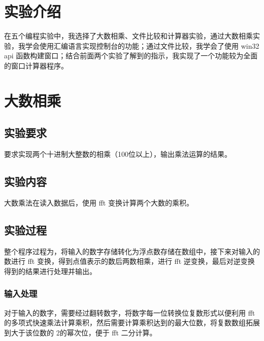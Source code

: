 \documentclass[proposal-report]{bitart}
\begin{document}
% 

\pagestyle{fancy}
\setcounter{page}{1}


\setlength{\parskip}{0em}
\renewcommand{\baselinestretch}{1.53}
\setlength{\parindent}{1.02cm}

\tableofcontents
\newpage



\section{实验介绍}

在五个编程实验中，我选择了大数相乘、文件比较和计算器实验，通过大数相乘实验，我学会使用汇编语言实现控制台的功能；通过文件比较，我学会了使用 win32 api 函数构建窗口；结合前面两个实验了解到的指示，我实现了一个功能较为全面的窗口计算器程序。

\section{大数相乘}

\subsection{实验要求}

要求实现两个十进制大整数的相乘（100位以上），输出乘法运算的结果。

\subsection{实验内容}

大数乘法在读入数据后，使用 fft 变换计算两个大数的乘积。

\subsection{实验过程}

整个程序过程为，将输入的数字存储转化为浮点数存储在数组中，接下来对输入的数进行 fft 变换，得到点值表示的数后两数相乘，进行 fft 逆变换，最后对逆变换得到的结果进行处理并输出。

\subsubsection{输入处理}

对于输入的数字，需要经过翻转数字，将数字每一位转换位复数形式以便利用 fft 的多项式快速乘法计算乘积，然后需要计算乘积达到的最大位数，将复数数组拓展到大于该位数的 2的幂次位，便于 fft 二分计算。
\end{document}
